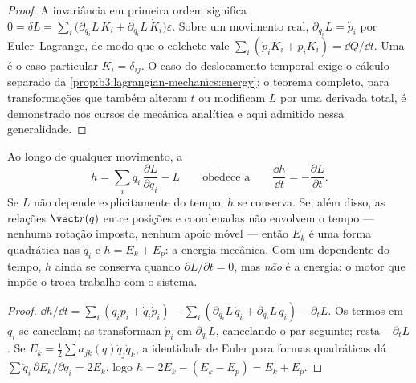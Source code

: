 \begin{proof}
A invariância em primeira ordem significa
$0 = \delta L = \sum_i\big(\partial_{q_i}L\,K_i +
\partial_{\dot q_i}L\,\dot K_i\big)\varepsilon$. Sobre um movimento
real, $\partial_{q_i}L = \dot p_i$ por Euler--Lagrange, de modo que o
colchete vale $\sum_i(\dot p_iK_i + p_i\dot K_i) = \dd Q/\dd t$. Uma
 é o caso particular $K_i = \delta_{ij}$. O caso do
deslocamento temporal exige o cálculo separado da
\cref{prop:b3:lagrangian-mechanics:energy}; o teorema completo, para
transformações que também alteram $t$ ou modificam $L$ por uma derivada
total, é demonstrado nos cursos de mecânica analítica e aqui admitido
nessa generalidade.
\end{proof}

\begin{proposition}\label{prop:b3:lagrangian-mechanics:energy}
Ao longo de qualquer movimento, a \emph{}
\[
h = \sum_i \dot q_i\,\frac{\partial L}{\partial\dot q_i} - L
\qquad\text{obedece a}\qquad
\frac{\dd h}{\dd t} = -\frac{\partial L}{\partial t} .
\]
Se $L$ não depende explicitamente do tempo, $h$ se conserva. Se, além
disso, as relações $\vect r(q)$ entre posições e coordenadas não
envolvem o tempo --- nenhuma rotação imposta, nenhum apoio móvel ---
então $E_k$ é uma forma quadrática nas $\dot q_i$ e $h = E_k + E_p$: a
energia mecânica. Com um  dependente do tempo, $h$ ainda se
conserva quando $\partial L/\partial t = 0$, mas \emph{não} é a
energia: o motor que impõe o  troca trabalho com o sistema.
\end{proposition}

\begin{proof}
$\dd h/\dd t = \sum_i(\ddot q_ip_i + \dot q_i\dot p_i) -
\sum_i(\partial_{q_i}L\,\dot q_i + \partial_{\dot q_i}L\,\ddot q_i) -
\partial_tL$. Os termos em $\ddot q_i$ se cancelam; as  transformam $\dot p_i$ em $\partial_{q_i}L$, cancelando
o par seguinte; resta $-\partial_tL$. Se $E_k = \tfrac12\sum a_{jk}(q)\dot
q_j\dot q_k$, a identidade de Euler para formas quadráticas dá $\sum\dot
q_i\,\partial E_k/\partial\dot q_i = 2E_k$, logo $h = 2E_k - (E_k - E_p)
= E_k + E_p$.
\end{proof}

